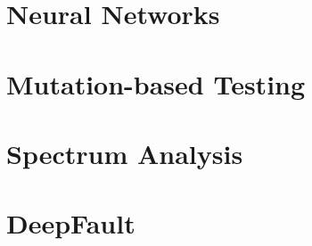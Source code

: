 \section{Neural Networks}
\lipsum[21-25]
\section{Mutation-based Testing}
\lipsum[26-30]
\section{Spectrum Analysis}
\lipsum[31-35]
\section{DeepFault}
\lipsum[36-40]